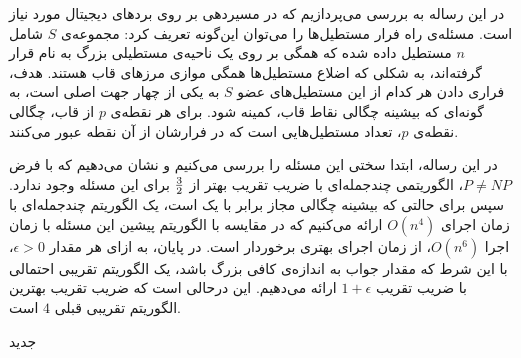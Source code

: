

\pagestyle{empty}

\begin{center}
\end{center}

در این رساله به بررسی  می‌پردازیم که در مسیر‌دهی بر روی برد‌های دیجیتال مورد نیاز است. مسئله‌ی راه فرار مستطیل‌ها را می‌توان این‌گونه تعریف کرد:
مجموعه‌ی $S$ شامل $n$ مستطیل داده شده که همگی بر روی یک ناحیه‌ی مستطیلی بزرگ به نام  قرار گرفته‌اند، به شکلی که اضلاع مستطیل‌ها همگی موازی مرز‌های قاب هستند. هدف، فراری دادن هر کدام از این مستطیل‌های عضو $S$ به یکی از چهار جهت اصلی است، به گونه‌ای که بیشینه چگالی نقاط قاب، کمینه شود.
برای هر نقطه‌ی $p$ از قاب، چگالی نقطه‌ی $p$، تعداد مستطیل‌هایی است که در فرارشان از آن نقطه عبور می‌کنند.
 
در این رساله، ابتدا سختی این مسئله را بررسی می‌کنیم و نشان می‌دهیم که با فرض $P \neq NP$، الگوریتمی چند‌جمله‌ای با ضریب تقریب بهتر از ${3} \over {2}$
برای این مسئله وجود ندارد.
سپس برای حالتی که بیشینه چگالی مجاز برابر با یک است، یک الگوریتم چند‌جمله‌ای با زمان اجرای $O(n ^ 4)$ ارائه می‌کنیم که در مقایسه با الگوریتم پیشین این مسئله با زمان اجرا $O(n ^ 6)$، از زمان اجرای بهتری برخوردار است.
در پایان، به ازای هر مقدار $\epsilon > 0$، با این شرط که مقدار جواب به اندازه‌ی کافی بزرگ باشد، یک الگوریتم تقریبی احتمالی با ضریب تقریب $1 + \epsilon$ ارائه می‌دهیم. این درحالی است که ضریب تقریب بهترین الگوریتم تقریبی قبلی $4$ است.

‌جدید
